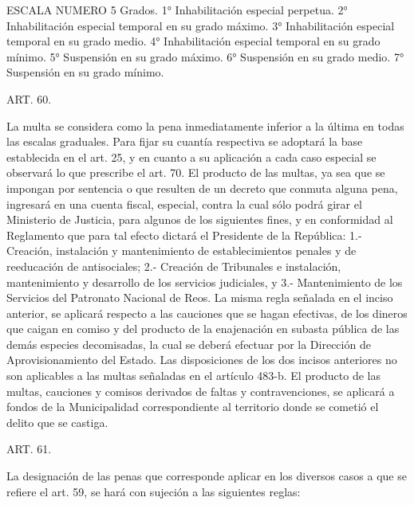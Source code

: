                     ESCALA NUMERO 5
    Grados.
    1° Inhabilitación especial perpetua.
    2° Inhabilitación especial temporal en su grado máximo.
    3° Inhabilitación especial temporal en su grado medio.
    4° Inhabilitación especial temporal en su grado mínimo.
    5° Suspensión en su grado máximo.
    6° Suspensión en su grado medio.
    7° Suspensión en su grado mínimo.


    ART. 60.

    La multa se considera como la pena inmediatamente inferior a la última en todas las escalas graduales.
    Para fijar su cuantía respectiva se adoptará la base establecida en el art. 25, y en cuanto a su aplicación a cada caso especial se observará lo que prescribe el art. 70.
    El producto de las multas, ya sea que se impongan por sentencia o que resulten de un decreto que conmuta alguna pena, ingresará en una cuenta fiscal, especial, contra la cual sólo podrá girar el Ministerio de Justicia, para algunos de los siguientes fines, y en conformidad al Reglamento que para tal efecto dictará el Presidente de la República:
    1.- Creación, instalación y mantenimiento de establecimientos penales y de reeducación de antisociales;
    2.- Creación de Tribunales e instalación, mantenimiento y desarrollo de los servicios judiciales, y
    3.- Mantenimiento de los Servicios del Patronato Nacional de Reos.
    La misma regla señalada en el inciso anterior, se aplicará respecto a las cauciones que se hagan efectivas, de los dineros que caigan en comiso y del producto de la enajenación en subasta pública de las demás especies decomisadas, la cual se deberá efectuar por la Dirección de Aprovisionamiento del Estado.
    Las disposiciones de los dos incisos anteriores no son aplicables a las multas señaladas en el artículo 483-b.
    El producto de las multas, cauciones y comisos derivados de faltas y contravenciones, se aplicará a fondos de la Municipalidad correspondiente al territorio donde se cometió el delito que se castiga.



    ART. 61.

    La designación de las penas que corresponde aplicar en los diversos casos a que se refiere el art. 59, se hará con sujeción a las siguientes reglas:

